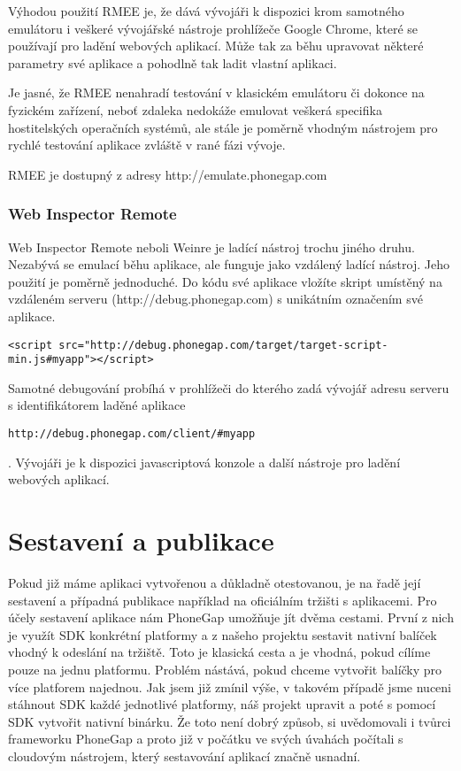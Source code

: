 Výhodou použití RMEE je, že dává vývojáři k dispozici krom samotného emulátoru i veškeré vývojářské nástroje prohlížeče Google Chrome, které se používají pro ladění webových aplikací. Může tak za běhu upravovat některé parametry své aplikace a pohodlně tak ladit vlastní aplikaci.

Je jasné, že RMEE nenahradí testování v klasickém emulátoru či dokonce na fyzickém zařízení, neboť zdaleka nedokáže emulovat veškerá specifika hostitelských operačních systémů, ale stále je poměrně vhodným nástrojem pro rychlé testování aplikace zvláště v rané fázi vývoje.

RMEE je dostupný z adresy http://emulate.phonegap.com

\subsubsection{Web Inspector Remote}
Web Inspector Remote neboli Weinre je ladící nástroj trochu jiného druhu. Nezabývá se emulací běhu aplikace, ale funguje jako vzdálený ladící nástroj. Jeho použití je poměrně jednoduché. Do kódu své aplikace vložíte skript umístěný na vzdáleném serveru (http://debug.phonegap.com) s unikátním označením své aplikace.

\begin{verbatim}
<script src="http://debug.phonegap.com/target/target-script-min.js#myapp"></script>
\end{verbatim}

Samotné debugování probíhá v prohlížeči do kterého zadá vývojář adresu serveru s identifikátorem laděné aplikace 
\begin{verbatim}
http://debug.phonegap.com/client/#myapp
\end{verbatim}. 
Vývojáři je k dispozici javascriptová konzole a další nástroje pro ladění webových aplikací.

\section{Sestavení a publikace}
Pokud již máme aplikaci vytvořenou a důkladně otestovanou, je na řadě její sestavení a případná publikace například na oficiálním tržišti s aplikacemi. Pro účely sestavení aplikace nám PhoneGap umožňuje jít dvěma cestami. První z nich je využít SDK konkrétní platformy a z našeho projektu sestavit nativní balíček vhodný k odeslání na tržiště. Toto je klasická cesta a je vhodná, pokud cílíme pouze na jednu platformu. Problém nástává, pokud chceme vytvořit balíčky pro více platforem najednou. Jak jsem již zmínil výše, v takovém případě jsme nuceni stáhnout SDK každé jednotlivé platformy, náš projekt upravit a poté s pomocí SDK vytvořit nativní binárku. Že toto není dobrý způsob, si uvědomovali i tvůrci frameworku PhoneGap a proto již v počátku ve svých úvahách počítali s cloudovým nástrojem, který sestavování aplikací značně usnadní.

